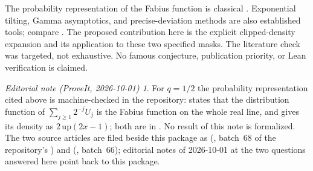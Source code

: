 \documentclass[11pt,oneside]{article}
\theoremstyle{remark}\newtheorem{remark}[theorem]{Remark}
\newtheorem*{ednote}{Editorial note (ProveIt, 2026-10-01)}
\numberwithin{equation}{section}
\begin{document}
The probability representation of the Fabius function is classical
\cite{arias}. Exponential tilting, Gamma asymptotics, and precise-deviation
methods are also established tools; compare \cite{fmnn,dlmf}.
The proposed contribution here is the explicit clipped-density expansion
and its application to these two specified masks. The literature check was
targeted, not exhaustive. No famous conjecture, publication priority, or
Lean verification is claimed.
\begin{ednote}
For $q=1/2$ the probability representation cited above is machine-checked
in the repository:
states that the distribution function of $\sum_{j\ge1}2^{-j}U_j$ is the
Fabius function on the whole real line, and
gives its density as $2\,\mathrm{up}(2x-1)$; both are in
.
No result of this note is formalized. The two source articles are filed
beside this package as 
(\cite{repo-late}, batch~68 of the repository's )
and 
(\cite{repo-early}, batch~66); editorial notes of 2026-10-01 at the two
questions answered here point back to this package.
\end{ednote}
\end{document}
